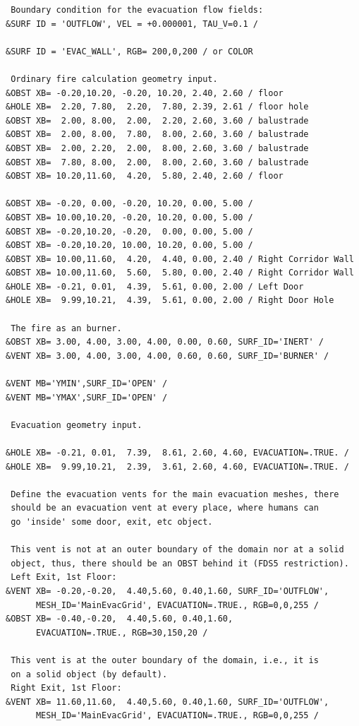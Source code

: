 \documentclass[12pt,a4paper,final,twoside]{stylevk}
\begin{document}
{\begin{verbatim}
 Boundary condition for the evacuation flow fields:
&SURF ID = 'OUTFLOW', VEL = +0.000001, TAU_V=0.1 /

&SURF ID = 'EVAC_WALL', RGB= 200,0,200 / or COLOR

 Ordinary fire calculation geometry input.
&OBST XB= -0.20,10.20, -0.20, 10.20, 2.40, 2.60 / floor
&HOLE XB=  2.20, 7.80,  2.20,  7.80, 2.39, 2.61 / floor hole
&OBST XB=  2.00, 8.00,  2.00,  2.20, 2.60, 3.60 / balustrade
&OBST XB=  2.00, 8.00,  7.80,  8.00, 2.60, 3.60 / balustrade
&OBST XB=  2.00, 2.20,  2.00,  8.00, 2.60, 3.60 / balustrade
&OBST XB=  7.80, 8.00,  2.00,  8.00, 2.60, 3.60 / balustrade
&OBST XB= 10.20,11.60,  4.20,  5.80, 2.40, 2.60 / floor

&OBST XB= -0.20, 0.00, -0.20, 10.20, 0.00, 5.00 /
&OBST XB= 10.00,10.20, -0.20, 10.20, 0.00, 5.00 /
&OBST XB= -0.20,10.20, -0.20,  0.00, 0.00, 5.00 /
&OBST XB= -0.20,10.20, 10.00, 10.20, 0.00, 5.00 /
&OBST XB= 10.00,11.60,  4.20,  4.40, 0.00, 2.40 / Right Corridor Wall
&OBST XB= 10.00,11.60,  5.60,  5.80, 0.00, 2.40 / Right Corridor Wall
&HOLE XB= -0.21, 0.01,  4.39,  5.61, 0.00, 2.00 / Left Door
&HOLE XB=  9.99,10.21,  4.39,  5.61, 0.00, 2.00 / Right Door Hole

 The fire as an burner.
&OBST XB= 3.00, 4.00, 3.00, 4.00, 0.00, 0.60, SURF_ID='INERT' /
&VENT XB= 3.00, 4.00, 3.00, 4.00, 0.60, 0.60, SURF_ID='BURNER' /

&VENT MB='YMIN',SURF_ID='OPEN' / 
&VENT MB='YMAX',SURF_ID='OPEN' / 

 Evacuation geometry input.

&HOLE XB= -0.21, 0.01,  7.39,  8.61, 2.60, 4.60, EVACUATION=.TRUE. /
&HOLE XB=  9.99,10.21,  2.39,  3.61, 2.60, 4.60, EVACUATION=.TRUE. /

 Define the evacuation vents for the main evacuation meshes, there
 should be an evacuation vent at every place, where humans can
 go 'inside' some door, exit, etc object.

 This vent is not at an outer boundary of the domain nor at a solid
 object, thus, there should be an OBST behind it (FDS5 restriction).
 Left Exit, 1st Floor:
&VENT XB= -0.20,-0.20,  4.40,5.60, 0.40,1.60, SURF_ID='OUTFLOW', 
      MESH_ID='MainEvacGrid', EVACUATION=.TRUE., RGB=0,0,255 /
&OBST XB= -0.40,-0.20,  4.40,5.60, 0.40,1.60, 
      EVACUATION=.TRUE., RGB=30,150,20 / 

 This vent is at the outer boundary of the domain, i.e., it is
 on a solid object (by default).
 Right Exit, 1st Floor:
&VENT XB= 11.60,11.60,  4.40,5.60, 0.40,1.60, SURF_ID='OUTFLOW', 
      MESH_ID='MainEvacGrid', EVACUATION=.TRUE., RGB=0,0,255 /


\end{verbatim}}
\end{document}
